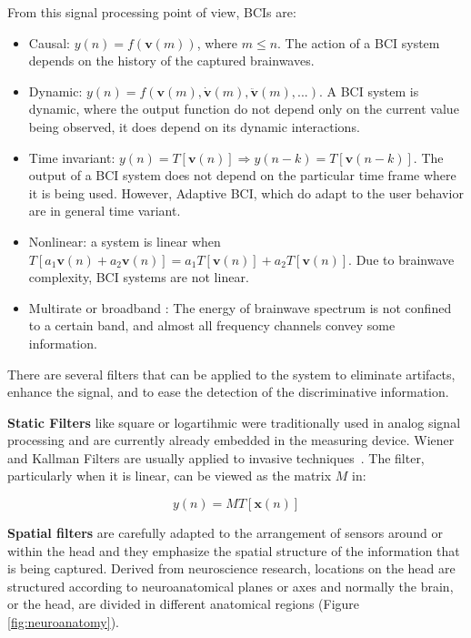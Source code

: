 From this signal processing point of view, BCIs are:

\begin{itemize}
\item Causal:  $ y(n) = f( \mathbf{v}(m) ) $, where $ m \leq n $.  The action of a BCI system depends on the history of the captured brainwaves.
\item Dynamic: $ y(n) = f( \mathbf{v}(m),  \mathbf{\dot{v}}(m),\mathbf{\ddot{v}}(m),...) $.  A BCI system is dynamic, where the output function do not depend only on the current value being observed, it does depend on its dynamic interactions.
\item Time invariant: $ y(n) = T\left[ \mathbf{v}(n) \right] \Rightarrow y(n-k) = T\left[ \mathbf{v}(n-k) \right] $.  The output of a BCI system does not depend on the particular time frame where it is being used.  However, Adaptive BCI, which do adapt to the user behavior are in general time variant.
\item Nonlinear: a system is linear when $T\left[ a_1 \mathbf{v}(n) + a_2 \mathbf{v}(n) \right]  = a_1 T \left[ \mathbf{v}(n) \right] + a_2 T \left[ \mathbf{v}(n) \right] $. Due to brainwave complexity, BCI systems are not linear.
\item Multirate or broadband \cite{Miller2010}:  The energy of brainwave spectrum is not confined to a certain band, and almost all frequency channels convey some information.
\end{itemize}

There are several filters that can be applied to the system to eliminate artifacts, enhance the signal, and to ease the detection of the discriminative information.

\textbf{Static Filters} like square or logartihmic were traditionally used in analog signal processing and are currently already embedded in the measuring device.  Wiener and Kallman Filters are usually applied to invasive techniques~\cite{NeuralEngineeringBookBinHe}.  The filter, particularly when it is linear, can be viewed as the matrix $M$ in:

\begin{equation}
y(n) = M T\left[\mathbf{x}(n)\right]
\label{eq:filters}
\end{equation}

\textbf{Spatial filters} are carefully adapted to the arrangement of sensors around or within the head and they emphasize the spatial structure of the information that is being captured. Derived from neuroscience research, locations on the head are structured according to neuroanatomical planes or axes and normally the brain, or the head, are divided in different anatomical regions (Figure \ref{fig:neuroanatomy}).   

